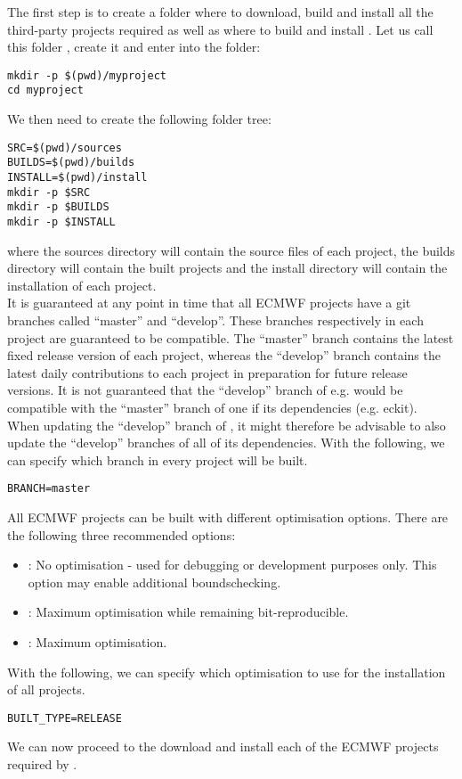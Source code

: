 The first step is to create a folder where to download, build 
and install all the third-party projects required as well as 
where to build and install \Atlas. Let us call this folder 
, create it and enter into the folder:
%
\begin{lstlisting}[style=BashStyle]
mkdir -p $(pwd)/myproject
cd myproject
\end{lstlisting}
%
We then need to create the following folder tree:
%
\begin{lstlisting}[style=BashStyle]
SRC=$(pwd)/sources
BUILDS=$(pwd)/builds
INSTALL=$(pwd)/install
mkdir -p $SRC 
mkdir -p $BUILDS 
mkdir -p $INSTALL
\end{lstlisting}
%
where the sources directory will contain the source files
of each project, the builds directory will contain the 
built projects and the install directory will contain 
the installation of each project.\\
%
It is guaranteed at any point in time that all ECMWF projects have
a git branches called ``master'' and ``develop''. These branches
respectively in each project are guaranteed to be compatible. The
``master'' branch contains the latest fixed release version of each
project, whereas the ``develop'' branch contains the latest daily
contributions to each project in preparation for future release
versions. It is not guaranteed that the ``develop'' branch of e.g.
\Atlas would be compatible with the ``master'' branch of one if its
dependencies (e.g. eckit).\\
When updating the ``develop'' branch of \Atlas, it might therefore
be advisable to also update the ``develop'' branches of all of its
dependencies.
With the following, we can specify which branch in every project
will be built.
\begin{lstlisting}[style=BashStyle]
BRANCH=master
\end{lstlisting}
%
All ECMWF projects can be built with different optimisation options.
There are the following 
three recommended options:\\
\begin{itemize}
\setlength\itemsep{0.1em}
\item {}: No optimisation - used for debugging or development
                     purposes only. This option may enable additional
                     boundschecking.
\item {}: Maximum optimisation while remaining bit-reproducible.
\item {}: Maximum optimisation.
\end{itemize}
With the following, we can specify which optimisation to use for the
installation of all projects.
\begin{lstlisting}[style=BashStyle]
BUILT_TYPE=RELEASE
\end{lstlisting}
%
We can now proceed to the download and install
each of the ECMWF projects required by \Atlas.
%
